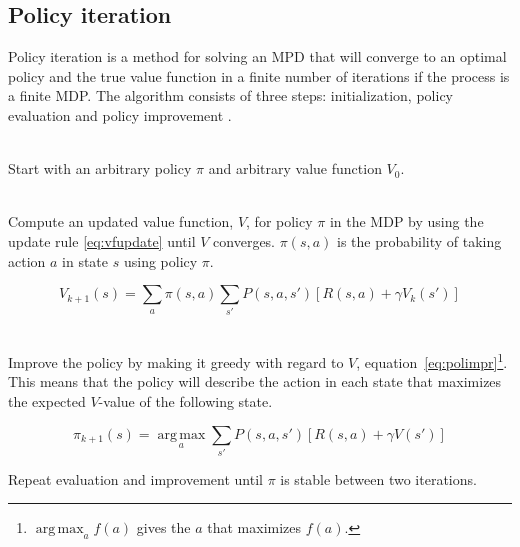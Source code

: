 \subsection{Policy iteration}
\label{sec:pol_itr}

Policy iteration is a method for solving an MPD that will converge to an
optimal policy and the true value function in a finite number of iterations if
the process is a finite MDP. The algorithm consists of three steps:
initialization, policy evaluation and policy improvement
\parencite{barto1998reinforcement}.

\begin{description}
\item[Initialization] \hfill \\
    Start with an arbitrary policy $\pi$ and arbitrary value function $V_0$.

\item[Policy evaluation] \hfill \\
  Compute an updated value function, $V$, for policy $\pi$ in the MDP by using
  the update rule \eqref{eq:vfupdate} until $V$ converges. $\pi(s, a)$ is the
  probability of taking action $a$ in state $s$ using policy $\pi$.

\begin{equation} \label{eq:vfupdate}
  V_{k+1} (s) = \sum_a \pi(s, a) \sum_{s'} P(s, a, s') \left[ R(s, a) + \gamma V_k(s')  \right]
\end{equation}

\item[Policy improvement] \hfill \\
  Improve the policy by making it greedy with regard to $V$,
  equation~\eqref{eq:polimpr}\footnote{$\operatorname*{arg\,max} _a f(a)$ gives
  the $a$ that maximizes $f(a)$.}. This means that the policy will describe the
  action in each state that maximizes the expected $V$-value of the following
  state. 

\begin{equation} \label{eq:polimpr}
  \pi_{k+1} (s) = \operatorname*{arg\,max}_a \sum_{s'}P(s, a, s') \left[ R(s, a) + \gamma V(s') \right]
\end{equation}

\item Repeat evaluation and improvement until $\pi$ is stable between two iterations.
\end{description}


